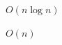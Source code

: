\documentclass{article}
\begin{document}
$O(n \log n)$
\pagebreak

$O(n)$
\pagebreak
\end{document}
